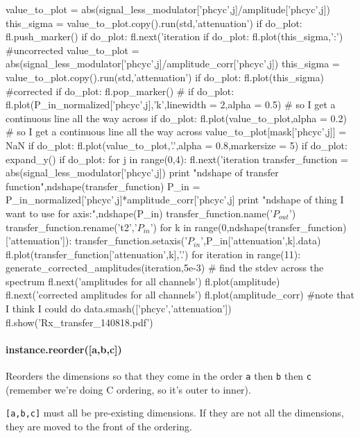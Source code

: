 \begin{python}
{{{        value_to_plot = abs(signal_less_modulator['phcyc',j]/amplitude['phcyc',j])
        this_sigma = value_to_plot.copy().run(std,'attenuation')
        if do_plot: fl.push_marker()
        if do_plot: fl.next('iteration %
        if do_plot: fl.plot(this_sigma,':') #uncorrected
        value_to_plot = abs(signal_less_modulator['phcyc',j]/amplitude_corr['phcyc',j])
        this_sigma = value_to_plot.copy().run(std,'attenuation')
        if do_plot: fl.plot(this_sigma) #corrected
        if do_plot: fl.pop_marker()
        #}}}
        if do_plot: fl.plot(P_in_normalized['phcyc',j],'k',linewidth = 2,alpha = 0.5) # so I get a continuous line all the way across
        if do_plot: fl.plot(value_to_plot,alpha = 0.2) # so I get a continuous line all the way across
        value_to_plot[mask['phcyc',j]] = NaN
        if do_plot: fl.plot(value_to_plot,'.',alpha = 0.8,markersize = 5)
        if do_plot: expand_y()
    if do_plot:
        for j in range(0,4):
            fl.next('iteration %
            transfer_function = abs(signal_less_modulator['phcyc',j])
            print "ndshape of transfer function",ndshape(transfer_function)
            P_in = P_in_normalized['phcyc',j]*amplitude_corr['phcyc',j]
            print "ndshape of thing I want to use for axis:",ndshape(P_in)
            transfer_function.name('$P_{out}$')
            transfer_function.rename('t2','$P_{in}$')
            for k in range(0,ndshape(transfer_function)['attenuation']):
                transfer_function.setaxis('$P_{in}$',P_in['attenuation',k].data)
                fl.plot(transfer_function['attenuation',k],'.')
for iteration in range(11):
    generate_corrected_amplitudes(iteration,5e-3)
# find the stdev across the spectrum
fl.next('amplitudes for all channels')
fl.plot(amplitude)
fl.next('corrected amplitudes for all channels')
fl.plot(amplitude_corr)
#note that I think I could do data.smash(['phcyc','attenuation'])
fl.show('Rx_transfer_140818.pdf')
\end{python}
\paragraph{instance.reorder([a,b,c])}
Reorders the dimensions so that they come in the order \texttt{a} then \texttt{b} then \texttt{c} 
(remember we're doing C ordering, so it's outer to inner).

\texttt{[a,b,c]} must all be pre-existing dimensions.
If they are not all the dimensions, they are moved to the front of the ordering.
